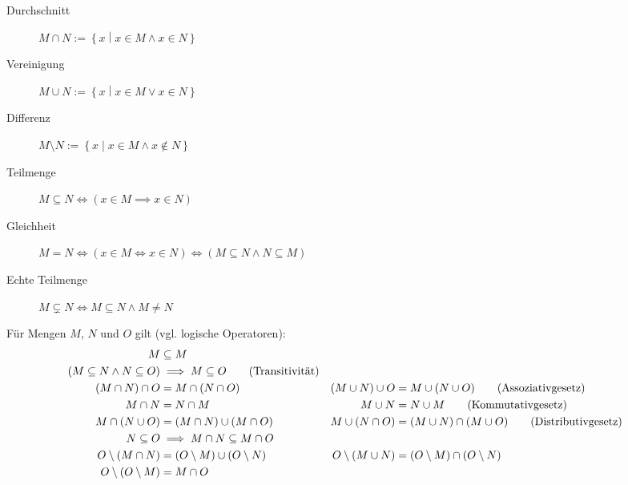 \begin{definition}[Mengenoperationen]
  \begin{description}
  \item[Durchschnitt] $M \cap N := \left\{ x \middle| x \in M \wedge x \in N \right\}$\index[sym]{$\cap$}
  \item[Vereinigung] $M \cup N := \left\{ x \middle| x \in M \vee x \in N \right\}$\index[sym]{$\cup$}
  \item[Differenz] $M \setminus N := \left\{ x \middle| x \in M \wedge x \not\in N \right\}$\index[sym]{$\setminus$}
  \item[Teilmenge] $M \subseteq N \iff (x \in M \implies x \in N)$\index[sym]{$\subseteq$}
  \item[Gleichheit] $M = N \iff (x \in M \iff x \in N) \iff (M \subseteq N \wedge N \subseteq M)$\index[sym]{$=$}
  \item[Echte Teilmenge] $M \subsetneq N \iff M \subseteq N \wedge M \neq N$\index[sym]{$\subsetneq$}
  \end{description}
\end{definition}

\begin{theorem}
  Für Mengen $M$, $N$ und $O$ gilt (vgl. logische Operatoren):
  \begin{align*}
    M &\subseteq M\\
    (M \subseteq N \wedge N \subseteq O) &\implies M \subseteq O \tag{Transitivität\index{Menge!Transitivität}}\\
    (M \cap N) \cap O &= M \cap (N \cap O) & (M \cup N) \cup O &= M \cup (N \cup O)  \tag{Assoziativgesetz\index{Menge!Assoziativgesetz}} \\
    M \cap N &= N \cap M & M \cup N &= N \cup M \tag{Kommutativgesetz\index{Menge!Kommutativgesetz}} \\
    M \cap (N \cup O) &= (M \cap N) \cup (M \cap O) & M \cup (N \cap O) &= (M \cup N) \cap (M \cup O) \tag{Distributivgesetz\index{Menge!Distributivgesetz}} \\
    N \subseteq O &\implies M \cap N \subseteq M \cap O \\
    O \setminus (M \cap N) &= (O \setminus M) \cup (O \setminus N) & O \setminus (M \cup N) &= (O \setminus M) \cap (O \setminus N) \\
    O \setminus (O \setminus M) &= M \cap O
  \end{align*}
\end{theorem}

